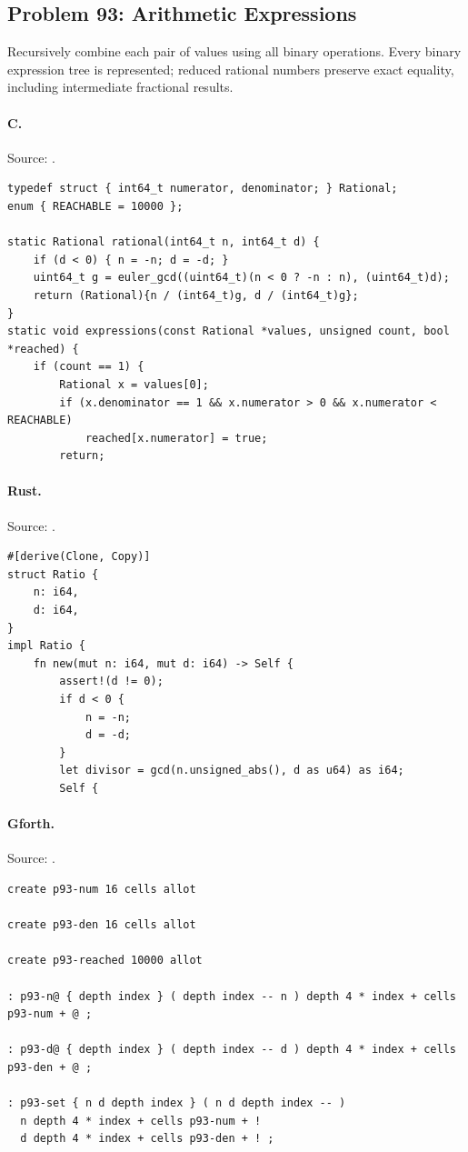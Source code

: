 \subsection{Problem 93: Arithmetic Expressions}
\label{walkthrough:p93}
Recursively combine each pair of values using all binary operations. Every binary expression tree is represented; reduced rational numbers preserve exact equality, including intermediate fractional results.

\paragraph{C.} Source: .
\begin{lstlisting}
typedef struct { int64_t numerator, denominator; } Rational;
enum { REACHABLE = 10000 };

static Rational rational(int64_t n, int64_t d) {
    if (d < 0) { n = -n; d = -d; }
    uint64_t g = euler_gcd((uint64_t)(n < 0 ? -n : n), (uint64_t)d);
    return (Rational){n / (int64_t)g, d / (int64_t)g};
}
static void expressions(const Rational *values, unsigned count, bool *reached) {
    if (count == 1) {
        Rational x = values[0];
        if (x.denominator == 1 && x.numerator > 0 && x.numerator < REACHABLE)
            reached[x.numerator] = true;
        return;
\end{lstlisting}

\paragraph{Rust.} Source: .
\begin{lstlisting}
#[derive(Clone, Copy)]
struct Ratio {
    n: i64,
    d: i64,
}
impl Ratio {
    fn new(mut n: i64, mut d: i64) -> Self {
        assert!(d != 0);
        if d < 0 {
            n = -n;
            d = -d;
        }
        let divisor = gcd(n.unsigned_abs(), d as u64) as i64;
        Self {
\end{lstlisting}

\paragraph{Gforth.} Source: .
\begin{lstlisting}
create p93-num 16 cells allot

create p93-den 16 cells allot

create p93-reached 10000 allot

: p93-n@ { depth index } ( depth index -- n ) depth 4 * index + cells p93-num + @ ;

: p93-d@ { depth index } ( depth index -- d ) depth 4 * index + cells p93-den + @ ;

: p93-set { n d depth index } ( n d depth index -- )
  n depth 4 * index + cells p93-num + !
  d depth 4 * index + cells p93-den + ! ;
\end{lstlisting}

